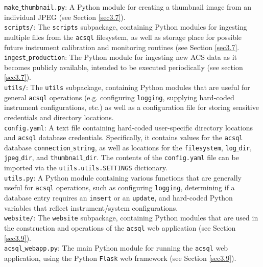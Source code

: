 \documentclass[10pt,journal,compsoc]{IEEEtran}
\begin{document}
\noindent\texttt{make$\_$thumbnail.py}: A Python module for creating a thumbnail image from an individual JPEG (see Section \ref{sec3.7}).\\

\noindent\texttt{scripts/}: The \texttt{scripts} subpackage, containing Python modules for ingesting multiple files from the \texttt{acsql} filesystem, as well as storage place for possible
future instrument calibration and monitoring routines (see Section \ref{sec3.7}.\\

\noindent\texttt{ingest$\_$production}: The Python module for ingesting new ACS data as it becomes publicly available, intended to be executed periodically (see section \ref{sec3.7}).\\

\noindent\texttt{utils/}: The \texttt{utils} subpackage, containing Python modules that are useful for general \texttt{acsql} operations (e.g. configuring \texttt{logging}, supplying hard-coded
instrument configurations, etc.) as well as a configuration file for storing sensitive credentials and directory locations.\\

\noindent\texttt{config.yaml}: A text file containing hard-coded user-specific directory locations and \texttt{acsql} database credentials.  Specifically, it contains values for the \texttt{acsql}
database \texttt{connection$\_$string}, as well as locations for the \texttt{filesystem}, \texttt{log$\_$dir}, \texttt{jpeg$\_$dir}, and \texttt{thumbnail$\_$dir}.  The contents of the
\texttt{config.yaml} file can be imported via the \texttt{utils.utils.SETTINGS} dictionary.\\

\noindent\texttt{utils.py}: A Python module containing various functions that are generally useful for \texttt{acsql} operations, such as configuring \texttt{logging}, determining if a database
entry requires an \texttt{insert} or an \texttt{update}, and hard-coded Python variables that reflect instrument/system configurations.\\

\noindent\texttt{website/}: The \texttt{website} subpackage, containing Python modules that are used in the construction and operations of the \texttt{acsql} web application (see Section \ref{sec3.9}).\\

\noindent\texttt{acsql$\_$webapp.py}: The main Python module for running the \texttt{acsql} web application, using the Python \texttt{Flask} web framework (see Section \ref{sec3.9}).\\
\end{document}
